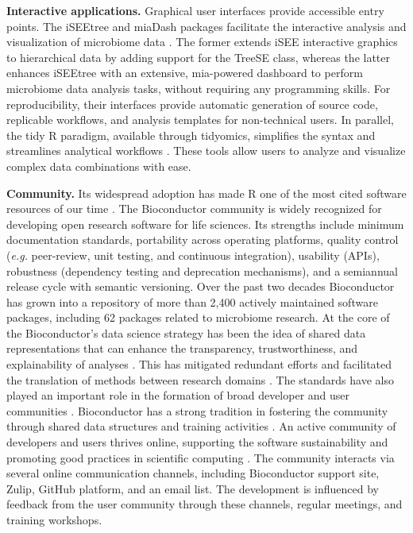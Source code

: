 \documentclass[
  sn-nature,
]{sn-jnl}
\begin{document}
\textbf{Interactive applications.} Graphical user interfaces provide
accessible entry points. The iSEEtree and miaDash packages facilitate
the interactive analysis and visualization of microbiome data
\citep{benedetti2025}. The former extends iSEE interactive graphics to
hierarchical data by adding support for the TreeSE class, whereas the
latter enhances iSEEtree with an extensive, mia-powered dashboard to
perform microbiome data analysis tasks, without requiring any
programming skills. For reproducibility, their interfaces provide
automatic generation of source code, replicable workflows, and analysis
templates for non-technical users. In parallel, the tidy R paradigm,
available through tidyomics, simplifies the syntax and streamlines
analytical workflows \citep{hutchison2024}. These tools allow users to
analyze and visualize complex data combinations with ease.

\textbf{Community.} Its widespread adoption has made R one of the most
cited software resources of our time \citep{pearson2025}. The
Bioconductor community is widely recognized for developing open research
software for life sciences. Its strengths include minimum documentation
standards, portability across operating platforms, quality control
(\emph{e.g.} peer-review, unit testing, and continuous integration),
usability (APIs), robustness (dependency testing and deprecation
mechanisms), and a semiannual release cycle with semantic versioning.
Over the past two decades Bioconductor has grown into a repository of
more than 2,400 actively maintained software packages, including 62
packages related to microbiome research. At the core of the
Bioconductor's data science strategy has been the idea of shared data
representations that can enhance the transparency, trustworthiness, and
explainability of analyses \citep{gentleman2004, lawrence2013}. This has
mitigated redundant efforts and facilitated the translation of methods
between research domains \citep{delia2023, barker2022}. The standards
have also played an important role in the formation of broad developer
and user communities \citep{drnevich2025}. Bioconductor has a strong
tradition in fostering the community through shared data structures and
training activities \citep{drnevich2025}. An active community of
developers and users thrives online, supporting the software
sustainability and promoting good practices in scientific computing
\citep{wilson2017}. The community interacts via several online
communication channels, including Bioconductor support site, Zulip,
GitHub platform, and an email list. The development is influenced by
feedback from the user community through these channels, regular
meetings, and training workshops.
\end{document}
